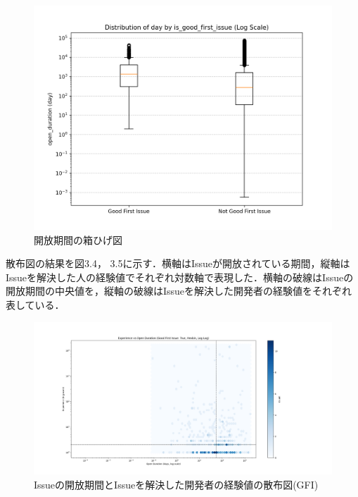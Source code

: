 \documentclass[11pt]{jreport}
\begin{document}
\begin{figure}[H]
\centerline{\includegraphics[width=0.9\linewidth]{@BSthesis2024_Nakai/BSthesis2024_Nakai_fig/time_box.png}}
\caption{開放期間の箱ひげ図}
\label{fig:milestone}
\end{figure}

散布図の結果を図3.4， 3.5に示す．横軸はIssueが開放されている期間，縦軸はIssueを解決した人の経験値でそれぞれ対数軸で表現した．横軸の破線はIssueの開放期間の中央値を，縦軸の破線はIssueを解決した開発者の経験値をそれぞれ表している．

\begin{figure}[H]
\centerline{\includegraphics[width=0.9\linewidth]{@BSthesis2024_Nakai/BSthesis2024_Nakai_fig/fhex_blue.png}}
\caption{Issueの開放期間とIssueを解決した開発者の経験値の散布図(GFI)}
\label{fig:milestone}
\end{figure}
\end{document}
